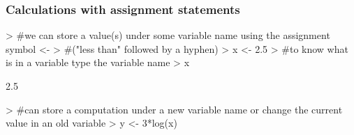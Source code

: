 \documentclass{beamer}
\begin{document}
\begin{frame}[fragile]\frametitle{Calculations with assignment statements}
\begin{Schunk}
\begin{Sinput}
> #we can store a value(s) under some variable name using the assignment symbol <- 
> #("less than" followed by a hyphen)
> x <- 2.5
> #to know what is in a variable type the variable name
> x
\end{Sinput}
\begin{Soutput}
[1] 2.5
\end{Soutput}
\begin{Sinput}
> #can store a computation under a new variable name or change the current value in an old variable
> y <- 3*log(x)
\end{Sinput}
\end{Schunk}
\end{frame}
\end{document}
